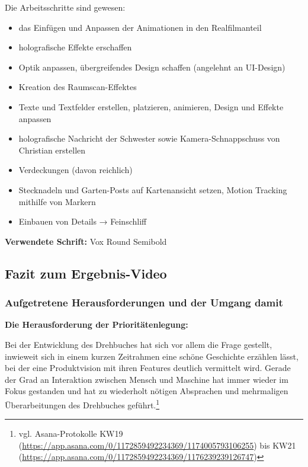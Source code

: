 Die Arbeitsschritte sind gewesen:

\begin{itemize}
\tightlist
\item
  das Einfügen und Anpassen der Animationen in den Realfilmanteil
\item
  holografische Effekte erschaffen
\item
  Optik anpassen, übergreifendes Design schaffen (angelehnt an
  UI-Design)
\item
  Kreation des Raumscan-Effektes
\item
  Texte und Textfelder erstellen, platzieren, animieren, Design und
  Effekte anpassen
\item
  holografische Nachricht der Schwester sowie Kamera-Schnappschuss von
  Christian erstellen
\item
  Verdeckungen (davon reichlich)
\item
  Stecknadeln und Garten-Posts auf Kartenansicht setzen, Motion Tracking
  mithilfe von Markern
\item
  Einbauen von Details → Feinschliff
\end{itemize}

\textbf{Verwendete Schrift:} Vox Round Semibold

\hypertarget{fazit-zum-ergebnis-video}{%
\subsection{Fazit zum Ergebnis-Video}\label{fazit-zum-ergebnis-video}}

\hypertarget{aufgetretene-herausforderungen-und-der-umgang-damit}{%
\subsubsection{Aufgetretene Herausforderungen und der Umgang
damit}\label{aufgetretene-herausforderungen-und-der-umgang-damit}}

\textbf{Die Herausforderung der Prioritätenlegung:}

Bei der Entwicklung des Drehbuches hat sich vor allem die Frage
gestellt, inwieweit sich in einem kurzen Zeitrahmen eine schöne
Geschichte erzählen lässt, bei der eine Produktvision mit ihren Features
deutlich vermittelt wird. Gerade der Grad an Interaktion zwischen Mensch
und Maschine hat immer wieder im Fokus gestanden und hat zu wiederholt
nötigen Absprachen und mehrmaligen Überarbeitungen des Drehbuches
geführt.\footnote{vgl. Asana-Protokolle KW19
  (\url{https://app.asana.com/0/1172859492234369/1174005793106255}) bis
  KW21 (\url{https://app.asana.com/0/1172859492234369/1176239239126747})}

